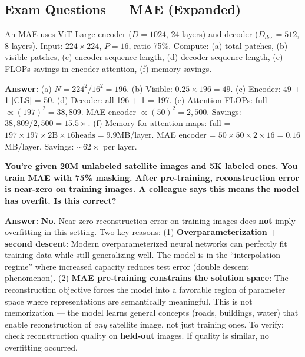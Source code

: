 \subsection{Exam Questions — MAE (Expanded)}

\begin{examq}
An MAE uses ViT-Large encoder ($D{=}1024$, 24 layers) and decoder ($D_{dec}{=}512$, 8 layers). Input: $224 \times 224$, $P{=}16$, ratio 75\%. Compute: (a) total patches, (b) visible patches, (c) encoder sequence length, (d) decoder sequence length, (e) FLOPs savings in encoder attention, (f) memory savings.

\textbf{Answer:} (a) $N = 224^2/16^2 = 196$. (b) Visible: $0.25 \times 196 = 49$. (c) Encoder: 49 + 1 [CLS] = 50. (d) Decoder: all 196 + 1 = 197. (e) Attention FLOPs: full $\propto (197)^2 = 38,809$. MAE encoder $\propto (50)^2 = 2,500$. Savings: $38,809/2,500 = 15.5\times$. (f) Memory for attention maps: full = $197 \times 197 \times 2\text{B} \times 16\text{heads} = 9.9$MB/layer. MAE encoder = $50 \times 50 \times 2 \times 16 = 0.16$MB/layer. Savings: $\sim$$62\times$ per layer.
\end{examq}

\begin{examq}
\textbf{You're given 20M unlabeled satellite images and 5K labeled ones. You train MAE with 75\% masking. After pre-training, reconstruction error is near-zero on training images. A colleague says this means the model has overfit. Is this correct?}

\textbf{Answer:} \textbf{No.} Near-zero reconstruction error on training images does \textbf{not} imply overfitting in this setting. Two key reasons: (1) \textbf{Overparameterization + second descent}: Modern overparameterized neural networks can perfectly fit training data while still generalizing well. The model is in the ``interpolation regime'' where increased capacity reduces test error (double descent phenomenon). (2) \textbf{MAE pre-training constrains the solution space}: The reconstruction objective forces the model into a favorable region of parameter space where representations are semantically meaningful. This is not memorization — the model learns general concepts (roads, buildings, water) that enable reconstruction of \emph{any} satellite image, not just training ones. To verify: check reconstruction quality on \textbf{held-out} images. If quality is similar, no overfitting occurred.
\end{examq}

